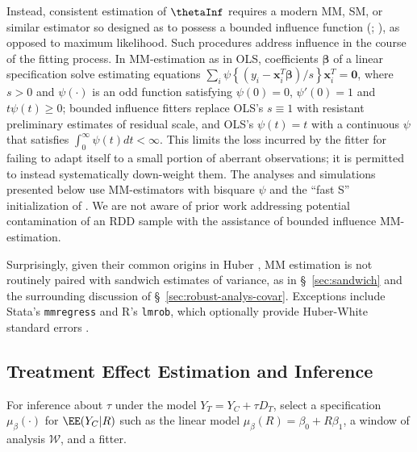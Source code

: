 Instead, consistent estimation of $\thetaInf$ requires a modern MM,  SM, or similar estimator so designed
 as to possess a bounded influence function (\citealp[Thm.~3]{he1991localbreakdown};
\citealp{yohaiZamar1997locallyrobustMestimates}), as opposed to
maximum likelihood.
Such procedures address influence in the course of the fitting process.
 In MM-estimation as in OLS,
coefficients $\bm{\beta}$ of a linear specification solve estimating equations
$\sum_{i} \psi\left\{ ({y}_{i} -
\bm{x}_{i}^T\bm{\beta})/s \right\} \bm{x}_{i}^T =\bm{0}$, where $s>0$ and
$\psi(\cdot)$ is an odd function satisfying $\psi(0)=0$,
$\psi'(0)=1$ and $t\psi(t)\geq 0$; bounded influence fitters replace OLS's $s\equiv 1$ with resistant preliminary
estimates of residual scale, and OLS's $\psi(t) = t$ with a continuous $\psi$
that satisfies $\int_{0}^{\infty}\psi(t)dt < \infty$. This limits
the loss incurred by the fitter for failing to adapt itself to a small
portion of aberrant observations;
it is permitted to instead systematically down-weight them.
The analyses and simulations presented below use MM-estimators with bisquare $\psi$ and
the ``fast S'' initialization of \citet{salibian-barreraYohai2006fastS}.
We are not aware of prior work addressing
potential contamination of an RDD sample with the assistance of
bounded influence MM-estimation.

Surprisingly, given their common origins in %
Huber \citeyearpar{huber1964robust}, MM estimation is not routinely
paired with sandwich estimates of variance, as in \S~\ref{sec:sandwich} and
the surrounding discussion of \S~\ref{sec:robust-analys-covar}.
Exceptions include Stata's \texttt{mmregress} and R's \texttt{lmrob},
which optionally provide Huber-White standard errors
\citep{verardiCroux2009robust,rousseuwetal2015robustbase}.




\subsection{Treatment Effect Estimation and Inference}
\label{sec:test-hypoth-no}

For inference about $\tau$ under the model
$Y_{T} = Y_{C} + \tau D_{T}$, select a specification
$\mu_{\beta}(\cdot)$ for $\EE(Y_{C}| R)$%
 such as the
linear model $\mu_{\beta}(R) =\beta_{0} + R\beta_{1}$, a window of
analysis $\mathcal{W}$, and a fitter.

